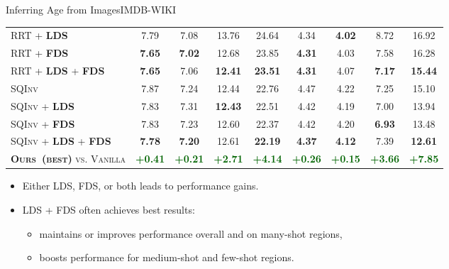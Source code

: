 \begin{frame}{Inferring Age from Images}{IMDB-WIKI}
\begin{table}[t]
\begin{center}
{\begin{tabular}{l|cccc|cccc}
					\textsc{RRT} + \textbf{\textsc{LDS}} & {7.79} &  7.08  & {13.76}  & {24.64} & {4.34} & \textbf{4.02} & {8.72} & {16.92} \\[1.2pt]
					\textsc{RRT} + \textbf{\textsc{FDS}}   & \textbf{7.65}  & \textbf{7.02} & 12.68 & 23.85 & \textbf{4.31} & 4.03 & 7.58 & 16.28 \\[1.2pt]
					\textsc{RRT} + \textbf{\textsc{LDS}} + \textbf{\textsc{FDS}}   & \textbf{7.65}  & 7.06  & \textbf{12.41}  & \textbf{23.51}  & \textbf{4.31} & {4.07} & \textbf{7.17} & \textbf{15.44} \\ \midrule\midrule
					\textsc{SQInv}      & 7.87 & 7.24 & 12.44  & 22.76 & 4.47 & 4.22 & 7.25   & 15.10 \\[1.2pt]
					\textsc{SQInv} + \textbf{\textsc{LDS}} & {7.83} & 7.31 & \textbf{12.43}  & {22.51} & {4.42} & {4.19} & {7.00}  & {13.94} \\[1.2pt]
					\textsc{SQInv} + \textbf{\textsc{FDS}}   & 7.83 & 7.23 & 12.60  & 22.37  & 4.42 & 4.20 & \textbf{6.93} & 13.48  \\[1.2pt]
					\textsc{SQInv} + \textbf{\textsc{LDS}} + \textbf{\textsc{FDS}}   & \textbf{7.78} & \textbf{7.20} & {12.61} & \textbf{22.19} & \textbf{4.37}    & \textbf{4.12} & 7.39  & \textbf{12.61}  \\ \midrule\midrule
					\textsc{\textbf{Ours~(best)} vs. Vanilla}   & \textcolor{darkgreen}{\textbf{+0.41}} & \textcolor{darkgreen}{\textbf{+0.21}} & \textcolor{darkgreen}{\textbf{+2.71}} & \textcolor{darkgreen}{\textbf{+4.14}} & \textcolor{darkgreen}{\textbf{+0.26}} & \textcolor{darkgreen}{\textbf{+0.15}} & \textcolor{darkgreen}{\textbf{+3.66}} & \textcolor{darkgreen}{\textbf{+7.85}} \\
					\bottomrule[1.5pt]
				\end{tabular}
			}
		\end{center}
	\end{table}
	\begin{itemize}\fontsize{7pt}{7.2}\selectfont
		\item Either LDS, FDS, or both leads to performance gains.
		\item LDS + FDS often achieves best results:
		\begin{itemize}\fontsize{7pt}{7.2}\selectfont
			\item maintains or improves performance overall
			and on many-shot regions,
			\item boosts performance for medium-shot and few-shot regions.
		\end{itemize}
	\end{itemize}
\end{frame}

